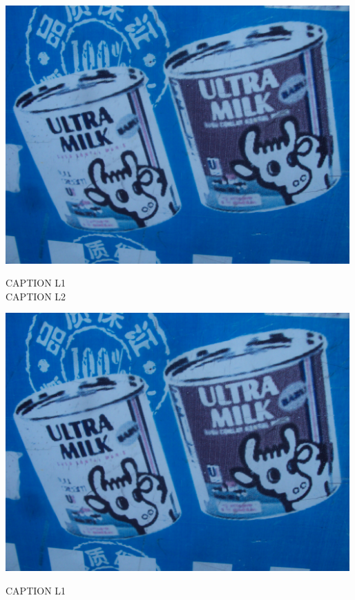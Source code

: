 \documentclass[10pt,letterpaper]{article}
\begin{document}
\vspace{0.25in}
\includegraphics[width=5.19in]{landscape.jpg}

CAPTION L1\\
CAPTION L2\\
\pagebreak

\includegraphics[width=5.19in]{landscape.jpg}

CAPTION L1\\
\pagebreak
\end{document}
